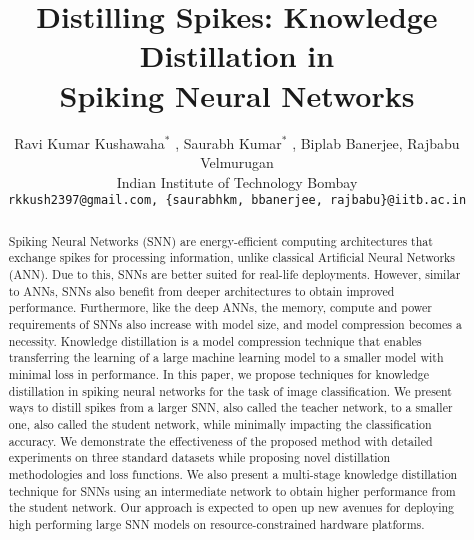 \documentclass{article}
\begin{document}
\title{Distilling Spikes: Knowledge Distillation in \\ 
Spiking Neural Networks}
\author{
  Ravi Kumar Kushawaha{$^*$} ,
  Saurabh Kumar{$^*$} ,
  Biplab Banerjee,
  Rajbabu Velmurugan
  \\[8pt]
Indian Institute of Technology Bombay \\
\texttt{rkkush2397@gmail.com, \{saurabhkm, bbanerjee, rajbabu\}@iitb.ac.in}\\
}

\maketitle
\begin{abstract}
\renewcommand{\thefootnote}{*}
Spiking Neural Networks (SNN) are energy-efficient computing architectures that exchange spikes for processing information, unlike classical Artificial Neural Networks (ANN). Due to this, SNNs are better suited for real-life deployments. However, similar to ANNs, SNNs also benefit from deeper architectures to obtain improved performance. Furthermore, like the deep ANNs, the memory, compute and power requirements of SNNs also increase with model size, and model compression becomes a necessity. Knowledge distillation is a model compression technique that enables transferring the learning of a large machine learning model to a smaller model with minimal loss in performance. In this paper, we propose techniques for knowledge distillation in spiking neural networks for the task of image classification. We present ways to distill spikes from a larger SNN, also called the teacher network, to a smaller one, also called the student network, while minimally impacting the classification accuracy. We demonstrate the effectiveness of the proposed method with detailed experiments on three standard datasets while proposing novel distillation methodologies and loss functions. We also present a multi-stage knowledge distillation technique for SNNs using an intermediate network to obtain higher performance from the student network. Our approach is expected to open up new avenues for deploying high performing large SNN models on resource-constrained hardware platforms.
\end{abstract}
\end{document}
